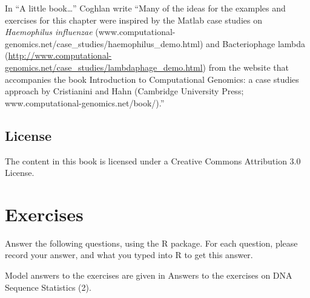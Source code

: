 \documentclass[
]{book}
\begin{document}
In ``A little book\ldots{}'' Coghlan write ``Many of the ideas for the examples and exercises for this chapter were inspired by the Matlab case studies on \emph{Haemophilus influenzae} (www.computational-genomics.net/case\_studies/haemophilus\_demo.html) and Bacteriophage lambda (\url{http://www.computational-genomics.net/case_studies/lambdaphage_demo.html}) from the website that accompanies the book Introduction to Computational Genomics: a case studies approach by Cristianini and Hahn (Cambridge University Press; www.computational-genomics.net/book/).''

\hypertarget{license-1}{%
\subsection{License}\label{license-1}}

The content in this book is licensed under a Creative Commons Attribution 3.0 License.

\hypertarget{exercises-1}{%
\section{Exercises}\label{exercises-1}}

Answer the following questions, using the R package. For each question, please record your answer, and what you typed into R to get this answer.

Model answers to the exercises are given in Answers to the exercises on DNA Sequence Statistics (2).
\end{document}
